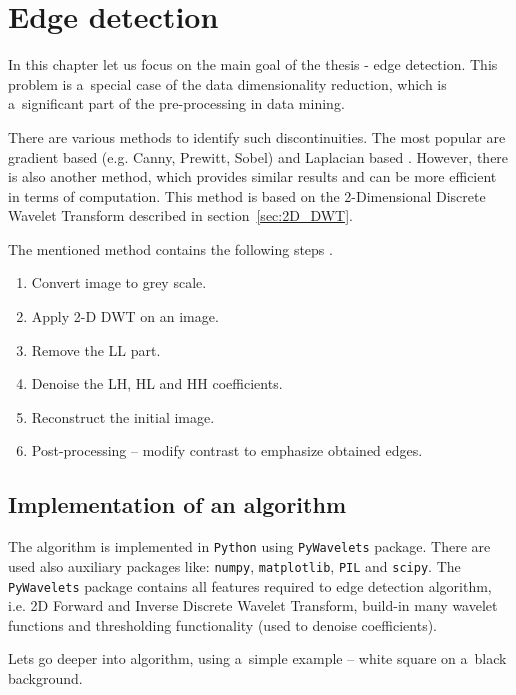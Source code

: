 \chapter{Edge detection} 
\label{ch:edge_detection}

In this chapter let us focus on the main goal of the thesis - edge detection. This problem is a~special case of the data dimensionality reduction, which is a~significant part of the pre-processing in data mining.


There are various methods to identify such discontinuities. The most popular are gradient based (e.g. Canny, Prewitt, Sobel) and Laplacian based \cite{EdgeDetectionReview}. However, there is also another method, which provides similar results and can be more efficient in terms of computation. This method is based on the 2-Dimensional Discrete Wavelet Transform described in section~\ref{sec:2D_DWT}. \newline

The mentioned method contains the following steps \cite{EdgeDetectionAlgorithm}.
\begin{enumerate}
\item Convert image to grey scale.
\item Apply 2-D DWT on an image.
\item Remove the LL part.
\item Denoise the LH, HL and HH coefficients.
\item Reconstruct the initial image.
\item Post-processing -- modify contrast to emphasize obtained edges.
\end{enumerate}

\section{Implementation of an algorithm}
\label{sec:implementation}

The algorithm is implemented in \texttt{Python} using \texttt{PyWavelets} package. There are used also auxiliary packages like: \texttt{numpy}, \texttt{matplotlib}, \texttt{PIL} and \texttt{scipy}. The \texttt{PyWavelets} package contains all features required to edge detection algorithm, i.e. 2D Forward and Inverse Discrete Wavelet Transform, build-in many wavelet functions and thresholding functionality (used to denoise coefficients).

Lets go deeper into algorithm, using a~simple example -- white square on a~black background.

